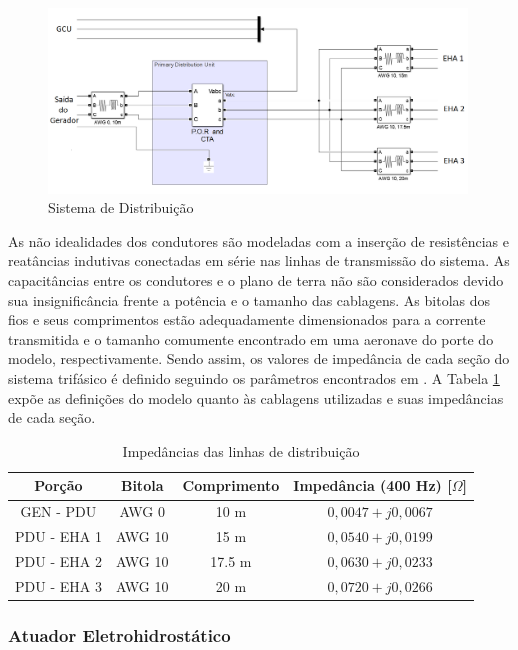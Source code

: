 \begin{figure}[!htb] %
	\centering
	\includegraphics[width=0.99\textwidth]{Cap4/Figuras/dist.png}
	\caption{Sistema de Distribuição}
	\label{fig:dist.png}
\end{figure}

As não idealidades dos condutores são modeladas com a inserção de resistências e reatâncias indutivas conectadas em série nas linhas de transmissão do sistema. As capacitâncias entre os condutores e o plano de terra não são considerados devido sua insignificância frente a potência e o tamanho das cablagens. As bitolas dos fios e seus comprimentos estão adequadamente dimensionados para a corrente transmitida e o tamanho comumente encontrado em uma aeronave do porte do modelo, respectivamente. Sendo assim, os valores de impedância de cada seção do sistema trifásico é definido seguindo os parâmetros encontrados em \cite{Exner1953}. A Tabela \ref{tab:Zdist} expõe as definições do modelo quanto às cablagens utilizadas e suas impedâncias de cada seção. 

\begin{table}[!htb]
	\centering
	\begin{tabular}{|c|c|c|c|}
		\hline
		\textbf{Porção}		&	\textbf{Bitola}		&	\textbf{Comprimento}	&	\textbf{Impedância (400 Hz) [$\Omega$]}	\\\hline
		GEN - PDU	&	AWG 0		&	10 m		&	$0,0047+j0,0067$	\\\hline
		PDU - EHA 1	&	AWG 10 		&	15 m		&	$0,0540+j0,0199$	\\\hline
		PDU - EHA 2 &	AWG 10		&	17.5 m 		&	$0,0630+j0,0233$	\\\hline
		PDU - EHA 3	&	AWG 10		&	20 m 		&	$0,0720+j0,0266$	\\\hline
	\end{tabular}
	\caption{Impedâncias das linhas de distribuição}
	\label{tab:Zdist}
\end{table}

\subsubsection{Atuador Eletrohidrostático}

